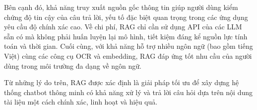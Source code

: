 Bên cạnh đó, khả năng truy xuất nguồn gốc thông tin giúp người dùng kiểm chứng độ tin cậy của câu trả lời, yếu tố đặc biệt quan trọng trong các ứng dụng yêu cầu độ chính xác cao. Về chi phí, RAG chỉ cần sử dụng API của các LLM sẵn có mà không phải huấn luyện lại mô hình, tiết kiệm đáng kể nguồn lực tính toán và thời gian. Cuối cùng, với khả năng hỗ trợ nhiều ngôn ngữ (bao gồm tiếng Việt) cùng các công cụ OCR và embedding, RAG đáp ứng tốt nhu cầu của người dùng trong môi trường đa dạng về ngôn ngữ.

Từ những lý do trên, RAG được xác định là giải pháp tối ưu để xây dựng hệ thống chatbot thông minh có khả năng xử lý và trả lời câu hỏi dựa trên nội dung tài liệu một cách chính xác, linh hoạt và hiệu quả.